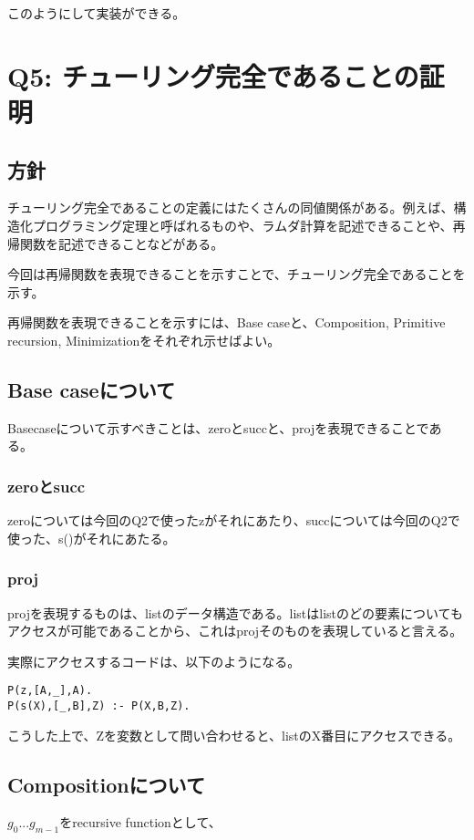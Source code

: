 \documentclass[uplatex,12pt]{jsarticle}
\begin{document}
このようにして実装ができる。


\section{Q5: チューリング完全であることの証明}
\subsection{方針}
チューリング完全であることの定義にはたくさんの同値関係がある。例えば、構造化プログラミング定理と呼ばれるものや、ラムダ計算を記述できることや、再帰関数を記述できることなどがある。

今回は再帰関数を表現できることを示すことで、チューリング完全であることを示す。

再帰関数を表現できることを示すには、Base caseと、Composition, Primitive recursion, Minimizationをそれぞれ示せばよい。

\subsection{Base caseについて}
Basecaseについて示すべきことは、zeroとsuccと、projを表現できることである。

\subsubsection{zeroとsucc}
zeroについては今回のQ2で使ったzがそれにあたり、succについては今回のQ2で使った、s()がそれにあたる。

\subsubsection{proj}
projを表現するものは、listのデータ構造である。listはlistのどの要素についてもアクセスが可能であることから、これはprojそのものを表現していると言える。

実際にアクセスするコードは、以下のようになる。
\begin{lstlisting}[caption=proj]
P(z,[A,_],A).
P(s(X),[_,B],Z) :- P(X,B,Z).
\end{lstlisting}
こうした上で、Zを変数として問い合わせると、listのX番目にアクセスできる。

\subsection{Compositionについて}

$g_{0} ... g_{m-1}$をrecursive functionとして、
\end{document}

